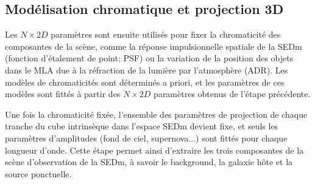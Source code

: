 \documentclass[../main/main.tex]{subfiles}
\begin{document}
\subsection{Modélisation chromatique et projection 3D}

Les $N\times2D$ paramètres sont ensuite utilisés pour fixer la chromaticité des composantes de la scène, comme la réponse impulsionnelle
spatiale de la SEDm (fonction d'étalement de point; PSF) ou la
variation de la position des objets dans le MLA due à la réfraction de
la lumière par l'atmosphère (ADR). Les modèles de chromaticités sont
déterminés a priori, et les paramètres de ces modèles sont fittés à
partir des $N\times2D$ paramètres obtenus de l'étape précédente.

Une fois la chromaticité fixée, l'ensemble des paramètres de projection de chaque tranche
du cube intrinsèque dans l'espace SEDm devient fixe, et seuls les
paramètres d'amplitudes (fond de ciel, supernova...) sont fittés pour
chaque longueur d'onde. Cette étape permet ainsi d'extraire les trois
composantes de la scène d'observation de la SEDm, à savoir le background, la galaxie hôte et la
source ponctuelle.

%
%
\end{document}
